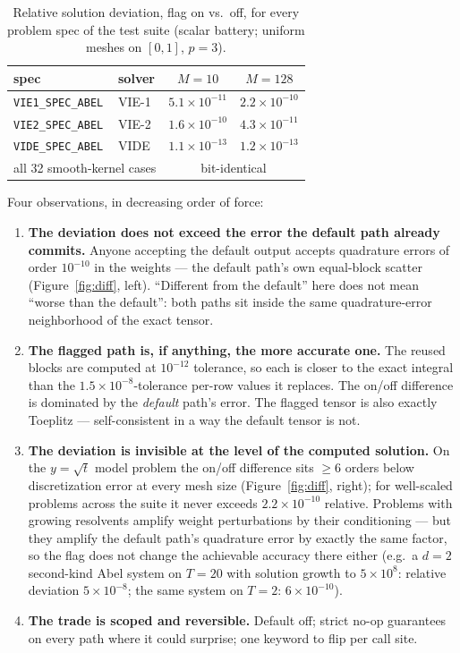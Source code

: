 \documentclass[11pt]{article}
\begin{document}
\begin{table}[t]
\centering
\begin{tabular}{llcc}
\toprule
spec & solver & $M=10$ & $M=128$\\
\midrule
\texttt{VIE1\_SPEC\_ABEL} & VIE-1 & $5.1\times10^{-11}$ & $2.2\times10^{-10}$\\
\texttt{VIE2\_SPEC\_ABEL} & VIE-2 & $1.6\times10^{-10}$ & $4.3\times10^{-11}$\\
\texttt{VIDE\_SPEC\_ABEL} & VIDE  & $1.1\times10^{-13}$ & $1.2\times10^{-13}$\\
\midrule
\multicolumn{2}{l}{all 32 smooth-kernel cases} &
\multicolumn{2}{c}{bit-identical}\\
\bottomrule
\end{tabular}
\caption{Relative solution deviation, flag on vs.\ off, for every
problem spec of the test suite (scalar battery; uniform meshes on
$[0,1]$, $p=3$).}
\label{tab:battery}
\end{table}

Four observations, in decreasing order of force:
\begin{enumerate}
\item \textbf{The deviation does not exceed the error the default path
  already commits.} Anyone accepting the default output accepts
  quadrature errors of order $10^{-10}$ in the weights --- the default
  path's own equal-block scatter (Figure~\ref{fig:diff}, left).
  ``Different from the default'' here does not mean ``worse than the
  default'': both paths sit inside the same quadrature-error
  neighborhood of the exact tensor.
\item \textbf{The flagged path is, if anything, the more accurate one.}
  The reused blocks are computed at $10^{-12}$ tolerance, so each is
  closer to the exact integral than the $1.5\times10^{-8}$-tolerance
  per-row values it replaces. The on/off difference is dominated by the
  \emph{default} path's error. The flagged tensor is also exactly
  Toeplitz --- self-consistent in a way the default tensor is not.
\item \textbf{The deviation is invisible at the level of the
  computed solution.} On the $y=\sqrt t$ model problem the on/off
  difference sits $\ge 6$ orders below discretization error at every
  mesh size (Figure~\ref{fig:diff}, right); for well-scaled problems
  across the suite it never exceeds $2.2\times10^{-10}$ relative.
  Problems with growing resolvents amplify weight perturbations by
  their conditioning --- but they amplify the default path's quadrature
  error by exactly the same factor, so the flag does not change the
  achievable accuracy there either (e.g.\ a $d=2$ second-kind Abel
  system on $T=20$ with solution growth to $5\times10^{8}$: relative
  deviation $5\times10^{-8}$; the same system on $T=2$:
  $6\times10^{-10}$).
\item \textbf{The trade is scoped and reversible.} Default off; strict
  no-op guarantees on every path where it could surprise; one keyword
  to flip per call site.
\end{enumerate}
\end{document}
